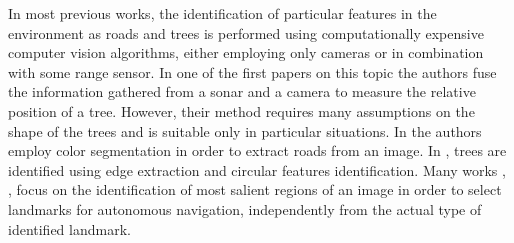 \documentclass[a4paper, 10pt, conference]{ieeeconf}      %
\begin{document}
In most previous works, the identification of particular features in the environment as roads and trees is performed using computationally expensive computer vision algorithms, either employing only cameras or in combination with some range sensor.
In one of the first papers on this topic \cite{94_MaOhYu} the authors fuse the information gathered from a sonar and a camera to measure the relative position of a tree.
However, their method requires many assumptions on the shape of the trees and is suitable only in particular situations.
In \cite{2003_CeDeMH} the authors employ color segmentation in order to extract roads from an image.
In \cite{2008_ZhXiXi}, trees are identified using edge extraction and circular features identification.
Many works \cite{Murrieta-cid02visualnavigation}, 
\cite{2004_ToTo}, \cite{2007_CeAlJi}
 focus on the identification of most salient regions of an image in order to select landmarks for autonomous navigation, independently from the actual type of identified landmark.
%
%
%
%
\end{document}
